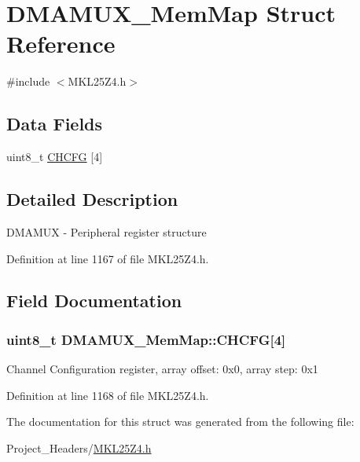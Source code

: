 \hypertarget{struct_d_m_a_m_u_x___mem_map}{}\section{D\+M\+A\+M\+U\+X\+\_\+\+Mem\+Map Struct Reference}
\label{struct_d_m_a_m_u_x___mem_map}


{\ttfamily \#include $<$M\+K\+L25\+Z4.\+h$>$}

\subsection*{Data Fields}
\begin{DoxyCompactItemize}
\item 
uint8\+\_\+t \hyperlink{struct_d_m_a_m_u_x___mem_map_afba9e1d292878648fca1bb42c6ac45da}{C\+H\+C\+FG} \mbox{[}4\mbox{]}
\end{DoxyCompactItemize}


\subsection{Detailed Description}
D\+M\+A\+M\+UX -\/ Peripheral register structure 

Definition at line 1167 of file M\+K\+L25\+Z4.\+h.



\subsection{Field Documentation}
\subsubsection[{\texorpdfstring{C\+H\+C\+FG}{CHCFG}}]{\setlength{\rightskip}{0pt plus 5cm}uint8\+\_\+t D\+M\+A\+M\+U\+X\+\_\+\+Mem\+Map\+::\+C\+H\+C\+FG\mbox{[}4\mbox{]}}\hypertarget{struct_d_m_a_m_u_x___mem_map_afba9e1d292878648fca1bb42c6ac45da}{}\label{struct_d_m_a_m_u_x___mem_map_afba9e1d292878648fca1bb42c6ac45da}
Channel Configuration register, array offset\+: 0x0, array step\+: 0x1 

Definition at line 1168 of file M\+K\+L25\+Z4.\+h.



The documentation for this struct was generated from the following file\+:\begin{DoxyCompactItemize}
\item 
Project\+\_\+\+Headers/\hyperlink{_m_k_l25_z4_8h}{M\+K\+L25\+Z4.\+h}\end{DoxyCompactItemize}
